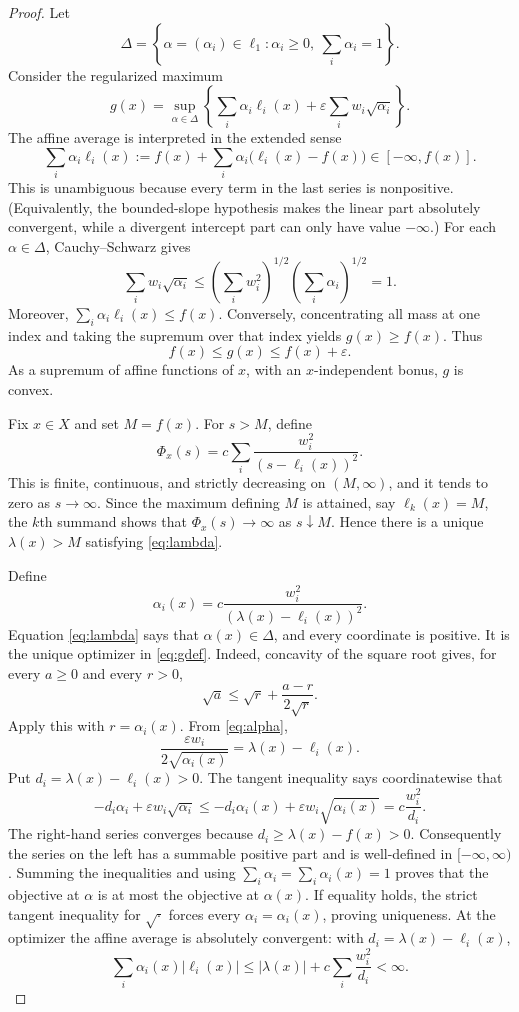 \documentclass[11pt]{article}
\newcommand{\eps}{\varepsilon}
\begin{document}
\begin{proof}
Let
\[
  \Delta=\left\{\alpha=(\alpha_i)\in\ell_1:
  \alpha_i\geq0,\ \sum_i\alpha_i=1\right\}.
\]
Consider the regularized maximum
\begin{equation}\label{eq:gdef}
  g(x)=\sup_{\alpha\in\Delta}
  \left\{\sum_i\alpha_i\ell_i(x)
  +\eps\sum_iw_i\sqrt{\alpha_i}\right\}.
\end{equation}
The affine average is interpreted in the extended sense
\[
 \sum_i\alpha_i\ell_i(x)
 :=f(x)+\sum_i\alpha_i\bigl(\ell_i(x)-f(x)\bigr)\in[-\infty,f(x)].
\]
This is unambiguous because every term in the last series is nonpositive.
(Equivalently, the bounded-slope hypothesis makes the linear part absolutely
convergent, while a divergent intercept part can only have value $-\infty$.)
For each $\alpha\in\Delta$, Cauchy--Schwarz gives
\[
  \sum_iw_i\sqrt{\alpha_i}
  \leq\left(\sum_iw_i^2\right)^{1/2}
       \left(\sum_i\alpha_i\right)^{1/2}=1.
\]
Moreover, $\sum_i\alpha_i\ell_i(x)\leq f(x)$.  Conversely, concentrating
all mass at one index and taking the supremum over that index yields
$g(x)\geq f(x)$.  Thus
\begin{equation}\label{eq:error}
  f(x)\leq g(x)\leq f(x)+\eps.
\end{equation}
As a supremum of affine functions of $x$, with an $x$-independent bonus,
$g$ is convex.

Fix $x\in X$ and set $M=f(x)$.  For $s>M$, define
\[
  \Phi_x(s)=c\sum_i\frac{w_i^2}{(s-\ell_i(x))^2}.
\]
This is finite, continuous, and strictly decreasing on $(M,\infty)$, and it
tends to zero as $s\to\infty$.  Since the maximum defining $M$ is attained,
say $\ell_k(x)=M$, the $k$th summand shows that
$\Phi_x(s)\to\infty$ as $s\downarrow M$.  Hence there is a unique
$\lambda(x)>M$ satisfying \eqref{eq:lambda}.

Define
\begin{equation}\label{eq:alpha}
  \alpha_i(x)=c\frac{w_i^2}{(\lambda(x)-\ell_i(x))^2}.
\end{equation}
Equation \eqref{eq:lambda} says that $\alpha(x)\in\Delta$, and every
coordinate is positive.  It is the unique optimizer in \eqref{eq:gdef}.
Indeed, concavity of the square root gives, for every $a\geq0$ and every
$r>0$,
\[
  \sqrt a\leq\sqrt r+\frac{a-r}{2\sqrt r}.
\]
Apply this with $r=\alpha_i(x)$.  From \eqref{eq:alpha},
\[
  \frac{\eps w_i}{2\sqrt{\alpha_i(x)}}
  =\lambda(x)-\ell_i(x).
\]
Put $d_i=\lambda(x)-\ell_i(x)>0$.  The tangent inequality says coordinatewise
that
\[
  -d_i\alpha_i+\eps w_i\sqrt{\alpha_i}
  \leq -d_i\alpha_i(x)+\eps w_i\sqrt{\alpha_i(x)}
  =c\frac{w_i^2}{d_i}.
\]
The right-hand series converges because $d_i\geq\lambda(x)-f(x)>0$.
Consequently the series on the left has a summable positive part and is
well-defined in $[-\infty,\infty)$.  Summing the inequalities and using
$\sum_i\alpha_i=\sum_i\alpha_i(x)=1$ proves that the objective at
$\alpha$ is at most the objective at $\alpha(x)$.  If equality holds, the
strict tangent inequality for $\sqrt{\cdot}$ forces every
$\alpha_i=\alpha_i(x)$, proving uniqueness.  At the optimizer the affine
average is absolutely convergent: with $d_i=\lambda(x)-\ell_i(x)$,
\[
 \sum_i\alpha_i(x)|\ell_i(x)|
 \leq |\lambda(x)|+c\sum_i\frac{w_i^2}{d_i}<\infty.
\]


\end{proof}
\end{document}
